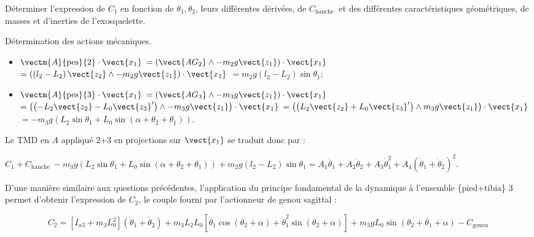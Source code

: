 \begin{question}
\label{2023_ccs_psi_q_10}
Déterminer l'expression de $C_{1}$ en fonction de $\theta_{1}, \theta_{2}$, leurs différentes dérivées, de $C_{\text {hanche }}$ et des différentes caractéristiques géométriques, de masses et d'inerties de l'exosquelette.
\end{question}
\ifprof
\begin{corrige}
Détermination des actions mécaniques.
\begin{itemize}
\item $\vectm{A}{\text{pes}}{2}\cdot \vect{x_1}$ 
$ =\left(\vect{AG_2}\wedge - m_2 g \vect{z_1} \right)\cdot \vect{x_1}$
$ =\left(\left( l_2 - L_2\right)\vect{z_2}\wedge - m_2 g \vect{z_1} \right)\cdot \vect{x_1}$
$ = m_2 g\left( l_2 - L_2\right) \sin \theta_1$;
\item $\vectm{A}{\text{pes}}{3}\cdot \vect{x_1}$ 
$ =\left(\vect{AG_3}\wedge - m_3 g \vect{z_1} \right)\cdot \vect{x_1}$
$ =\left(\left(  - L_2 \vect{z_2}- L_0 \vect{z_3}'\right)\wedge - m_3 g \vect{z_1} \right)\cdot \vect{x_1}$
$ =\left(\left( L_2 \vect{z_2} + L_0 \vect{z_3}'\right)\wedge m_3 g \vect{z_1} \right)\cdot \vect{x_1}$
$ = - m_3 g\left(  L_2 \sin \theta_1 +  L_0 \sin\left( \alpha + \theta_2 + \theta_1\right)\right) $.
\end{itemize}

Le TMD en $A$ appliqué 2+3 en projections sur $\vect{x_1}$ se traduit donc par :

  $C_{1} + C_{\textrm {hanche }}- m_3 g\left(  L_2 \sin \theta_1 +  L_0 \sin\left( \alpha + \theta_2 + \theta_1\right)\right)  + m_2 g\left( l_2 - L_2\right) \sin \theta_1 = A_{1} \ddot{\theta}_{1}+A_{2} \ddot{\theta}_{2}+A_{3} \dot{\theta}_{1}^{2}+A_{4}\left(\dot{\theta}_{1}+\dot{\theta}_{2}\right)^{2}$.

\end{corrige}
\else
\fi

D'une manière similaire aux questions précédentes, l'application du principe fondamental de la dynamique à l'ensemble \{pied+tibia\} 3 permet d'obtenir l'expression de $C_{2}$, le couple fourni par l'actionneur de genou sagittal :

$$
C_{2}=\left[I_{x 3}+m_{3} L_{0}^{2}\right]\left(\ddot{\theta}_{1}+\ddot{\theta}_{2}\right)+m_{3} L_{2} L_{0}\left[\ddot{\theta}_{1} \cos \left(\theta_{2}+\alpha\right)+\dot{\theta}_{1}^{2} \sin \left(\theta_{2}+\alpha\right)\right]+m_{3} g L_{0} \sin \left(\theta_{2}+\theta_{1}+\alpha\right)-C_{\text {genou }}
$$

